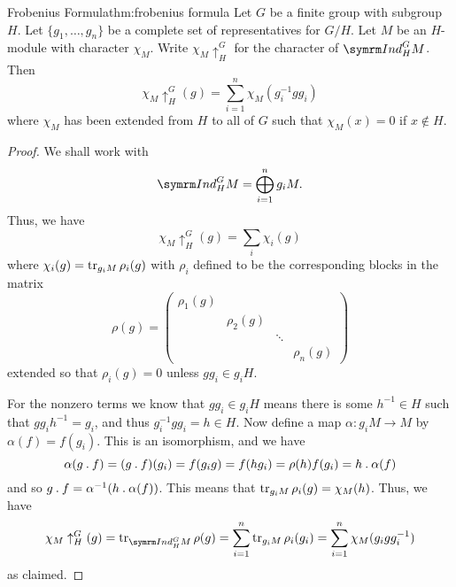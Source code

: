 \begin{thm}{Frobenius Formula}{thm:frobenius formula}
    Let \(G\) be a finite group with subgroup \(H\).
    Let \(\{g_1, \dotsc, g_n\}\) be a complete set of representatives for \(G/H\).
    Let \(M\) be an \(H\)-module with character \(\chi_M\).
    Write \(\chi_M\uparrow^G_H\) for the character of \(\Ind^G_H M\).
    Then
    \begin{equation}
        \chi_M\uparrow^G_H(g) = \sum_{i=1}^n \chi_M(g_i^{-1}gg_i)
    \end{equation}
    where \(\chi_M\) has been extended from \(H\) to all of \(G\) such that \(\chi_M(x) = 0\) if \(x \notin H\).
    \begin{proof}
        We shall work with
        \begin{equation}
            \Ind^G_H M = \bigoplus_{i=1}^n g_iM.
        \end{equation}
        Thus, we have
        \begin{equation}
            \chi_M\uparrow^G_H(g) = \sum_i \chi_i(g)
        \end{equation}
        where \(\chi_i(g) = \operatorname{tr}_{g_iM}\rho_i(g)\) with \(\rho_i\) defined to be the corresponding blocks in the matrix
        \begin{equation}
            \rho(g) = 
            \begin{pmatrix}
                \rho_1(g) & & \\
                & \rho_2(g) & &\\
                & & \ddots &\\
                & & & \rho_n(g)
            \end{pmatrix}
        \end{equation}
        extended so that \(\rho_i(g) = 0\) unless \(gg_i \in g_iH\).
        
        For the nonzero terms we know that \(gg_i \in g_iH\) means there is some \(h^{-1} \in H\) such that \(gg_ih^{-1} = g_i\), and thus \(g_i^{-1}gg_i = h \in H\).
        Now define a map \(\alpha \colon g_iM \to M\) by \(\alpha(f) = f(g_i)\).
        This is an isomorphism, and we have
        \begin{equation}
            \alpha(g \mathbin{.} f) = (g \mathbin{.} f)(g_i) = f(g_ig) = f(hg_i) = \rho(h)f(g_i) = h \mathbin{.} \alpha(f)
        \end{equation}
        and so \(g \mathbin{.} f = \alpha^{-1}(h \mathbin{.} \alpha(f))\).
        This means that \(\operatorname{tr}_{g_iM} \rho_i(g) = \chi_M(h)\).
        Thus, we have
        \begin{equation}
            \chi_M\uparrow^G_H(g) = \tr_{\Ind^G_H M} \rho(g) = \sum_{i=1}^n \tr_{g_i M} \rho_i(g_i) = \sum_{i=1}^n \chi_M(g_igg_i^{-1})
        \end{equation}
        as claimed.
    \end{proof}
\end{thm}

